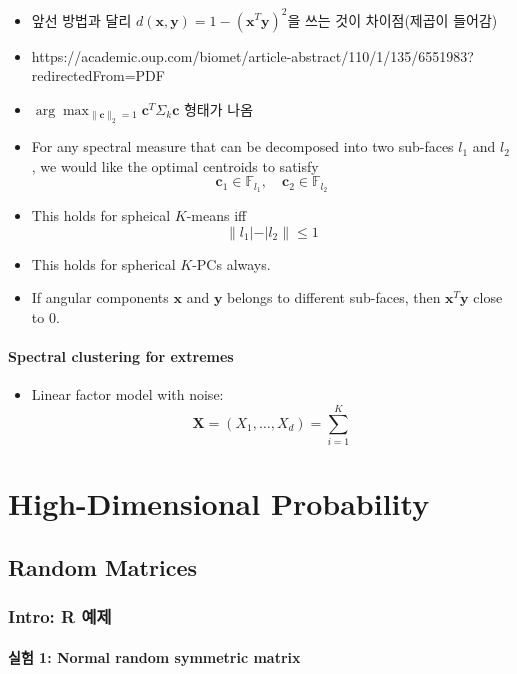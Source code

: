 \documentclass[
  13pt,
  letterpaper,
  DIV=11,
  numbers=noendperiod]{scrreprt}
\providecommand{\tightlist}{%
  \setlength{\itemsep}{0pt}\setlength{\parskip}{0pt}}\usepackage{longtable,booktabs,array}
\theoremstyle{plain}
\theoremstyle{definition}
\theoremstyle{definition}
\theoremstyle{plain}
\theoremstyle{definition}
\theoremstyle{plain}
\theoremstyle{remark}
\begin{document}
\begin{itemize}
\item
  앞선 방법과 달리 \(d(\pmb{x}, \pmb{y}) = 1-(\pmb{x}^T\pmb{y})^2\)을
  쓰는 것이 차이점(제곱이 들어감)
\item
  https://academic.oup.com/biomet/article-abstract/110/1/135/6551983?redirectedFrom=PDF
\item
  \(\arg\max_{\|\pmb{c}\|_2=1} \pmb{c}^T\Sigma_k \pmb{c}\) 형태가 나옴
\item
  For any spectral measure that can be decomposed into two sub-faces
  \(l_1\) and \(l_2\), we would like the optimal centroids to satisfy \[
  \pmb{c}_1 \in \mathbb{F}_{l_1}, \quad{} \pmb{c}_2 \in \mathbb{F}_{l_2}
  \]
\item
  This holds for spheical \(K\)-means iff \[
  \|l_1 | - | l_2 \| \leq 1
  \]
\item
  This holds for spherical \(K\)-PCs always.
\item
  If angular components \(\pmb{x}\) and \(\pmb{y}\) belongs to different
  sub-faces, then \(\pmb{x}^T\pmb{y}\) close to \(0\).
\end{itemize}

\subsection{Spectral clustering for
extremes}\label{spectral-clustering-for-extremes}

\begin{itemize}
\tightlist
\item
  Linear factor model with noise: \[
  \pmb{X} = (X_1, \ldots, X_d) = \sum_{i=1}^K
  \]
\end{itemize}

\part{High-Dimensional Probability}

\chapter{Random Matrices}\label{random-matrices}

\section{Intro: R 예제}\label{intro-r-uxc608uxc81c}

\subsection{실험 1: Normal random symmetric
matrix}\label{uxc2e4uxd5d8-1-normal-random-symmetric-matrix}
\end{document}
